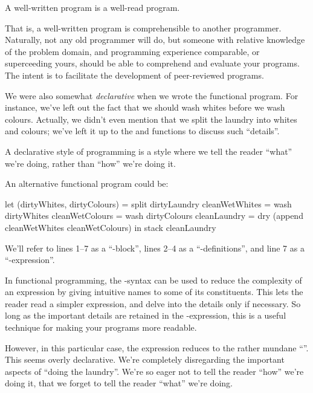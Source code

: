 \begin{definition}

A well-written program is a well-read program.

\end{definition}

That is, a well-written program is comprehensible to another programmer.
Naturally, not any old programmer will do, but someone with relative knowledge
of the problem domain, and programming experience comparable, or superceeding
yours, should be able to comprehend and evaluate your programs. The intent is
to facilitate the development of peer-reviewed programs.


We were also somewhat \emph{declarative} when we wrote the functional program.
For instance, we've left out the fact that we should wash whites before we wash
colours. Actually, we didn't even mention that we split the laundry into whites
and colours; we've left it up to the  and  functions to
discuss such ``details''.

\begin{definition}

A declarative style of programming is a style where we tell the reader ``what''
we're doing, rather than ``how'' we're doing it.

\end{definition}

An alternative functional program could be:

\begin{code}
let
  (dirtyWhites, dirtyColours) = split dirtyLaundry
  cleanWetWhites = wash dirtyWhites
  cleanWetColours = wash dirtyColours
  cleanLaundry = dry (append cleanWetWhites cleanWetColours)
in
  stack cleanLaundry
\end{code}

We'll refer to lines 1--7 as a ``-block'', lines 2--4 as a
``-definitions'', and line 7 as a ``-expression''.

In functional programming, the -syntax can be used to reduce the
complexity of an expression by giving intuitive names to some of its
constituents. This lets the reader read a simpler expression, and delve into
the details only if necessary. So long as the important details are retained in
the -expression, this is a useful technique for making your programs
more readable.

However, in this particular case, the expression reduces to the rather mundane
``''. This seems overly declarative. We're completely
disregarding the important aspects of ``doing the laundry''. We're so eager not
to tell the reader ``how'' we're doing it, that we forget to tell the reader
``what'' we're doing.


